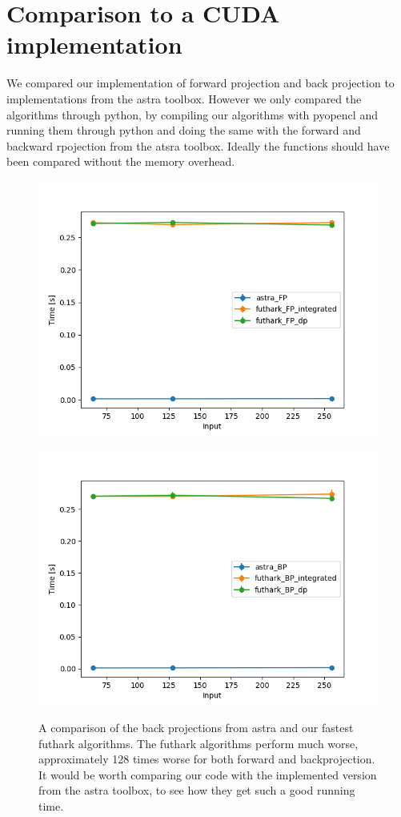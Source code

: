\section{Comparison to a CUDA implementation}
We compared our implementation of forward projection and back projection to implementations from the astra toolbox. However we only compared the algorithms through python, by compiling our algorithms with pyopencl and running them through python and doing the same with the forward and backward rpojection from the atsra toolbox. Ideally the functions should have been compared without the memory overhead.
\begin{figure}[h]
\includegraphics{images/FPplot.png}
\end{figure}
\begin{figure}[h]
\includegraphics{images/BPplot.png}
\label{astra}
  \caption{A comparison of the back projections from astra and our fastest futhark algorithms. The futhark algorithms perform much worse, approximately 128 times worse for both forward and backprojection. It would be worth comparing our code with the implemented version from the astra toolbox, to see how they get such a good running time.}
\end{figure}

